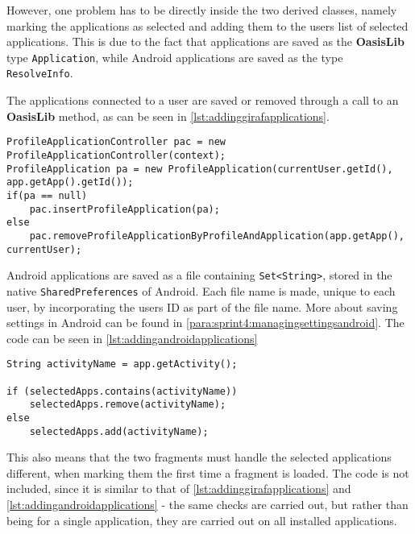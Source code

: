 However, one problem has to be directly inside the two derived classes, namely marking the applications as selected and adding them to the users list of selected applications.
This is due to the fact that \giraf applications are saved as the \textbf{OasisLib} type \lstinline!Application!, while Android applications are saved as the type \lstinline!ResolveInfo!.

The \giraf applications connected to a user are saved or removed through a call to an \textbf{OasisLib} method, as can be seen in \cref{lst:addinggirafapplications}.

\begin{lstlisting}[caption={The methods used for adding or removing a Giraf application to a user}, label={lst:addinggirafapplications}]
ProfileApplicationController pac = new ProfileApplicationController(context);
ProfileApplication pa = new ProfileApplication(currentUser.getId(), app.getApp().getId());
if(pa == null)
	pac.insertProfileApplication(pa);
else
	pac.removeProfileApplicationByProfileAndApplication(app.getApp(), currentUser);
\end{lstlisting}

Android applications are saved as a file containing \lstinline!Set<String>!, stored in the native \lstinline!SharedPreferences! of Android.
Each file name is made, unique to each user, by incorporating the users ID as part of the file name.
More about saving settings in Android can be found in \cref{para:sprint4:managingsettingsandroid}.
The code can be seen in \cref{lst:addingandroidapplications}\\

\begin{lstlisting}[caption={The methods used for adding or removing a Giraf application to a user. Please note that the documentation has been removed.}, label={lst:addingandroidapplications}]
String activityName = app.getActivity();

if (selectedApps.contains(activityName))
    selectedApps.remove(activityName);
else
    selectedApps.add(activityName);
\end{lstlisting}

This also means that the two fragments must handle the selected applications different, when marking them the first time a fragment is loaded.
The code is not included, since it is similar to that of \cref{lst:addinggirafapplications} and \cref{lst:addingandroidapplications} - the same checks are carried out, but rather than being for a single application, they are carried out on all installed applications.